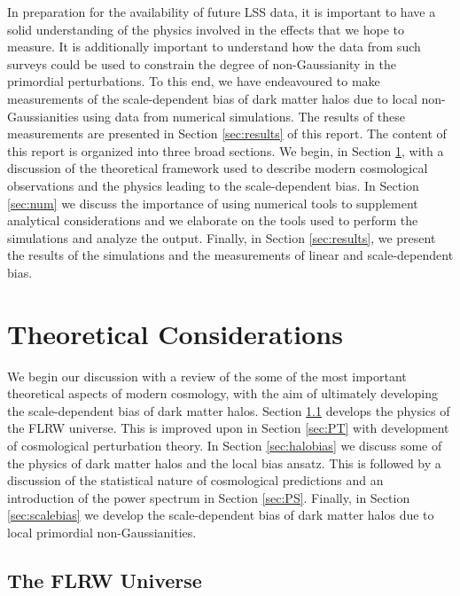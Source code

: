 \documentclass[10pt,letterpaper,final]{iopart}
\numberwithin{equation}{subsection}
\begin{document}
In preparation for the availability of future LSS data, it is important to have a solid understanding of the physics involved in the effects that we hope to measure. It is additionally important to understand how the data from such surveys could be used to constrain the degree of non-Gaussianity in the primordial perturbations. To this end, we have endeavoured to make measurements of the scale-dependent bias of dark matter halos due to local non-Gaussianities using data from numerical simulations. The results of these measurements are presented in Section \ref{sec:results} of this report. 
The content of this report is organized into three broad sections. We begin, in Section \ref{sec:theory}, with a discussion of the theoretical framework used to describe modern cosmological observations and the physics leading to the scale-dependent bias. In Section \ref{sec:num} we discuss the importance of using numerical tools to supplement analytical considerations and we elaborate on the tools used to perform the simulations and analyze the output. Finally, in Section \ref{sec:results}, we present the results of the simulations and the measurements of linear and scale-dependent bias. 





\section{Theoretical Considerations}\label{sec:theory}

We begin our discussion with a review of the some of the most important theoretical aspects of modern cosmology, with the aim of ultimately developing the scale-dependent bias of dark matter halos. Section \ref{sec:FLRW} develops the physics of the FLRW universe. This is improved upon in Section \ref{sec:PT} with development of cosmological perturbation theory. In Section \ref{sec:halobias} we discuss some of the physics of dark matter halos and the local bias ansatz. This is followed by a discussion of the statistical nature of cosmological predictions and an introduction of the power spectrum in Section \ref{sec:PS}. Finally, in Section \ref{sec:scalebias} we develop the scale-dependent bias of dark matter halos due to local primordial non-Gaussianities. 


%
\subsection{The FLRW Universe}\label{sec:FLRW}
\end{document}
